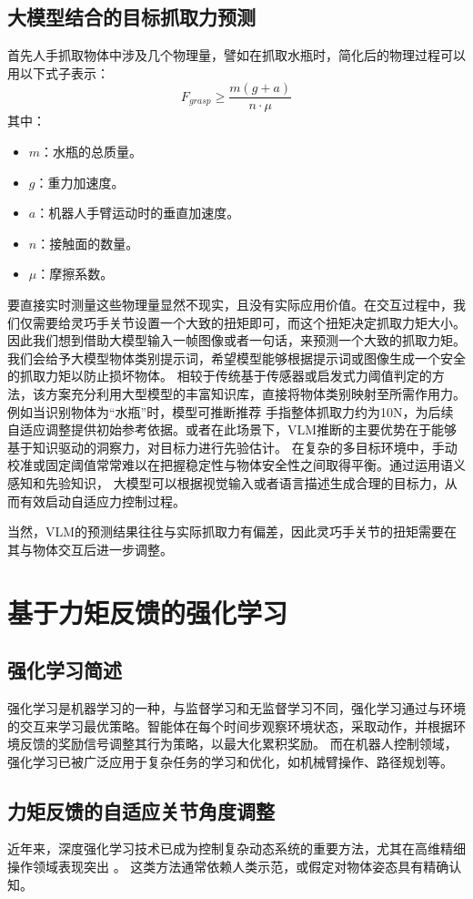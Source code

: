 \subsection{大模型结合的目标抓取力预测}
首先人手抓取物体中涉及几个物理量，譬如在抓取水瓶时，简化后的物理过程可以用以下式子表示：
\begin{equation}
    F_{grasp} \geq \frac{m(g + a)}{n \cdot \mu}
\end{equation}
其中：
\begin{itemize}
    \item $ m $：水瓶的总质量。
    \item $ g $：重力加速度。
    \item $ a $：机器人手臂运动时的垂直加速度。
    \item $ n $：接触面的数量。
    \item $ \mu $：摩擦系数。
\end{itemize}
要直接实时测量这些物理量显然不现实，且没有实际应用价值。在交互过程中，我们仅需要给灵巧手关节设置一个大致的扭矩即可，而这个扭矩决定抓取力矩大小。
因此我们想到借助大模型输入一帧图像或者一句话，来预测一个大致的抓取力矩。我们会给予大模型物体类别提示词，希望模型能够根据提示词或图像生成一个安全的抓取力矩以防止损坏物体。
相较于传统基于传感器或启发式力阈值判定的方法，该方案充分利用大型模型的丰富知识库，直接将物体类别映射至所需作用力。例如当识别物体为“水瓶”时，模型可推断推荐
手指整体抓取力约为10N，为后续自适应调整提供初始参考依据。或者在此场景下，VLM推断的主要优势在于能够基于知识驱动的洞察力，对目标力进行先验估计。
在复杂的多目标环境中，手动校准或固定阈值常常难以在把握稳定性与物体安全性之间取得平衡。通过运用语义感知和先验知识， 大模型可以根据视觉输入或者语言描述生成合理的目标力，从而有效启动自适应力控制过程。

当然，VLM的预测结果往往与实际抓取力有偏差，因此灵巧手关节的扭矩需要在其与物体交互后进一步调整。

\section{基于力矩反馈的强化学习}
\subsection{强化学习简述}
强化学习是机器学习的一种，与监督学习和无监督学习不同，强化学习通过与环境的交互来学习最优策略。智能体在每个时间步观察环境状态，采取动作，并根据环境反馈的奖励信号调整其行为策略，以最大化累积奖励。
而在机器人控制领域，强化学习已被广泛应用于复杂任务的学习和优化，如机械臂操作、路径规划等。
\subsection{力矩反馈的自适应关节角度调整}
近年来，深度强化学习技术已成为控制复杂动态系统的重要方法，尤其在高维精细操作领域表现突出
\cite{sheLearningHighDOFReachingandgrasping2022}\cite{christenDgraspPhysicallyPlausible2022}。
这类方法通常依赖人类示范\cite{rajeswaranLearningComplexDexterous2017}，或假定对物体姿态具有精确认知。

